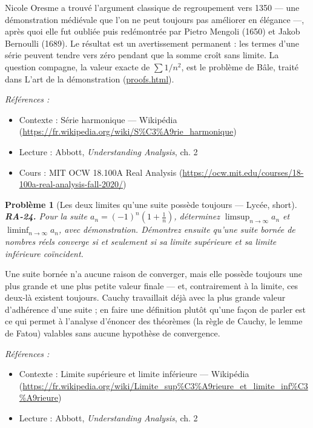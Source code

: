 \documentclass[11pt]{article}
\newtheorem{problem}{Problème}
\newenvironment{refs}{\par\small\noindent\emph{Références :}\begin{itemize}\setlength\itemsep{0pt}}{\end{itemize}\normalsize}
\begin{document}
\noindent Nicole Oresme a trouvé l'argument classique de regroupement vers 1350 --- une
démonstration médiévale que l'on ne peut toujours pas améliorer en élégance ---, après quoi elle fut
oubliée puis redémontrée par Pietro Mengoli (1650) et Jakob Bernoulli (1689). Le résultat est un
avertissement permanent : les termes d'une série peuvent tendre vers zéro pendant que la somme
croît sans limite. La question compagne, la valeur exacte de $ \sum 1/n^2 $, est le problème de
Bâle, traité dans L'art de la démonstration (\url{proofs.html}).

\begin{refs}
\item Contexte : Série harmonique --- Wikipédia (\url{https://fr.wikipedia.org/wiki/S%C3%A9rie_harmonique})
\item Lecture : Abbott, \textit{Understanding Analysis}, ch. 2
\item Cours : MIT OCW 18.100A Real Analysis (\url{https://ocw.mit.edu/courses/18-100a-real-analysis-fall-2020/})
\end{refs}

\bigskip

\begin{problem}[{Les deux limites qu'une suite possède toujours --- Lycée, short}]
\textbf{RA-24.} Pour la suite $ a_n = (-1)^n \left( 1 + \frac{1}{n}
\right) $, déterminez $ \limsup_{n \to \infty} a_n $ et $ \liminf_{n \to \infty} a_n $, avec
démonstration. Démontrez ensuite qu'une suite bornée de nombres réels converge si et seulement si sa
limite supérieure et sa limite inférieure coïncident.
\end{problem}

\noindent Une suite bornée n'a aucune raison de converger, mais elle possède toujours une
plus grande et une plus petite \og{} valeur finale \fg{} --- et, contrairement à la limite, ces deux-là
existent toujours. Cauchy travaillait déjà avec la plus grande valeur d'adhérence d'une suite ; en
faire une définition plutôt qu'une façon de parler est ce qui permet à l'analyse d'énoncer des
théorèmes (la règle de Cauchy, le lemme de Fatou) valables sans aucune hypothèse de convergence.

\begin{refs}
\item Contexte : Limite supérieure et limite inférieure --- Wikipédia (\url{https://fr.wikipedia.org/wiki/Limite_sup%C3%A9rieure_et_limite_inf%C3%A9rieure})
\item Lecture : Abbott, \textit{Understanding Analysis}, ch. 2
\end{refs}
\end{document}
